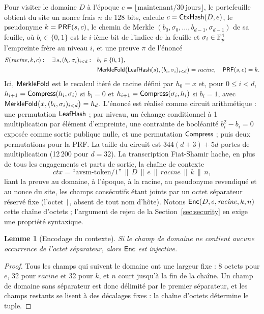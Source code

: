 \documentclass[11pt]{article}
\newtheorem{lemma}{Lemme}
\theoremstyle{definition}
\begin{document}
Pour visiter le domaine $D$ à l'époque $e = \lfloor \mathrm{maintenant} / 30\
\mathrm{jours} \rfloor$, le portefeuille obtient du site un nonce frais $n$ de 128 bits,
calcule $c = \mathsf{CtxHash}(D, e)$, le pseudonyme $k = \mathsf{PRF}(s, c)$, le chemin de Merkle $(b_0,
\sigma_0, \ldots, b_{d-1}, \sigma_{d-1})$ de sa feuille, où $b_i \in \{0,1\}$ est le
$i$-ième bit de l'indice de la feuille et $\sigma_i \in \mathbb{F}_p^4$ l'empreinte frère au niveau
$i$, et une preuve $\pi$ de l'énoncé
\begin{align*}
S(\mathit{racine}, k, c):\quad \exists\, s, (b_i, \sigma_i)_{i<d}:\quad
& b_i \in \{0,1\},\\
& \mathsf{MerkleFold}\bigl(\mathsf{LeafHash}(s), (b_i, \sigma_i)_{i<d}\bigr) = \mathit{racine},\quad
\mathsf{PRF}(s, c) = k.
\end{align*}
Ici, $\mathsf{MerkleFold}$ est le recalcul itéré de racine défini par $h_0 = x$ et, pour $0 \le i
< d$, $h_{i+1} = \mathsf{Compress}(h_i, \sigma_i)$ si $b_i = 0$ et $h_{i+1} = \mathsf{Compress}(\sigma_i,
h_i)$ si $b_i = 1$, avec $\mathsf{MerkleFold}\bigl(x, (b_i, \sigma_i)_{i<d}\bigr) = h_d$. L'énoncé
est réalisé comme circuit arithmétique : une permutation $\mathsf{LeafHash}$ ; par niveau, un
échange conditionnel à 1 multiplication par élément d'empreinte, une contrainte de
booléanité $b_i^2 - b_i = 0$ exposée comme sortie publique nulle, et une permutation
$\mathsf{Compress}$ ; puis deux permutations pour la PRF. La taille du circuit est $344(d+3) + 5d$
portes de multiplication (12\,200 pour $d = 32$). La transcription Fiat-Shamir hache, en
plus de tous les engagements et parts de sortie, la chaîne de contexte
\[
\mathit{ctx} = \text{``avsm-token/1''} \,\|\, D \,\|\, e \,\|\, \mathit{racine} \,\|\, k
\,\|\, n,
\]
liant la preuve au domaine, à l'époque, à la racine, au pseudonyme revendiqué et au nonce
du site, les champs consécutifs étant joints par un octet séparateur réservé fixe (l'octet
\texttt{|}, absent de tout nom d'hôte). Notons $\mathsf{Enc}(D, e, \mathit{racine}, k, n)$ cette
chaîne d'octets ; l'argument de rejeu de la Section~\ref{sec:security} en exige une
propriété syntaxique.

\begin{lemma}[Encodage du contexte]
\label{lem:enc}
Si le champ de domaine ne contient aucune occurrence de l'octet séparateur, alors $\mathsf{Enc}$
est injective.
\end{lemma}

\begin{proof}
Tous les champs qui suivent le domaine ont une largeur fixe : 8 octets pour $e$, 32 pour
$\mathit{racine}$ et 32 pour $k$, et $n$ court jusqu'à la fin de la chaîne. Un champ de
domaine sans séparateur est donc délimité par le premier séparateur, et les champs
restants se lisent à des décalages fixes : la chaîne d'octets détermine le tuple.
\end{proof}
\end{document}
